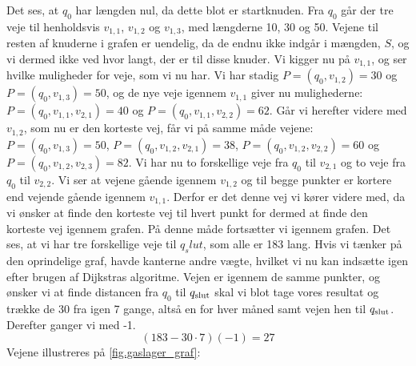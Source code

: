 Det ses, at $q_0$ har længden nul, da dette blot er startknuden. Fra $q_0$ går der tre veje til henholdsvis $v_{1,1}$, $v_{1,2}$ og $v_{1,3}$, med længderne 10, 30 og 50. Vejene til resten af knuderne i grafen er uendelig, da de endnu ikke indgår i mængden, $S$, og vi dermed ikke ved hvor langt, der er til disse knuder. Vi kigger nu på $v_{1,1}$, og ser hvilke muligheder for veje, som vi nu har. Vi har stadig $P=(q_{0},v_{1,2})=30$ og $P=(q_{0},v_{1,3})=50$, og de nye veje igennem $v_{1,1}$ giver nu mulighederne: $P=(q_{0},v_{1,1},v_{2,1})=40$ og $P=(q_{0},v_{1,1},v_{2,2})=62$. Går vi herefter videre med $v_{1,2}$, som nu er den korteste vej, får vi på samme måde vejene: $P=(q_{0},v_{1,3})=50$, $P=(q_{0},v_{1,2},v_{2,1})=38$, $P=(q_{0},v_{1,2},v_{2,2})=60$ og $P=(q_{0},v_{1,2},v_{2,3})=82$. Vi har nu to forskellige veje fra $q_{0}$ til $v_{2,1}$ og to veje fra $q_{0}$ til $v_{2,2}$. Vi ser at vejene gående igennem $v_{1,2}$ og til begge punkter er kortere end vejende gående igennem $v_{1,1}$. Derfor er det denne vej vi kører videre med, da vi ønsker at finde den korteste vej til hvert punkt for dermed at finde den korteste vej igennem grafen. På denne måde fortsætter vi igennem grafen. Det ses, at vi har tre forskellige veje til $q_slut$, som alle er 183 lang. Hvis vi tænker på den oprindelige graf, havde kanterne andre vægte, hvilket vi nu kan indsætte igen efter brugen af Dijkstras algoritme. Vejen er igennem de samme punkter, og ønsker vi at finde distancen fra $q_{0}$ til $q_{\textrm{slut}}$ skal vi blot tage vores resultat og trække de 30 fra igen 7 gange, altså en for hver måned samt vejen hen til $q_{\textrm{slut}}$. Derefter ganger vi med -1.
\begin{equation}
(183-30 \cdot 7) (-1) = 27
\end{equation}
Vejene illustreres på \autoref{fig.gaslager_graf}:





